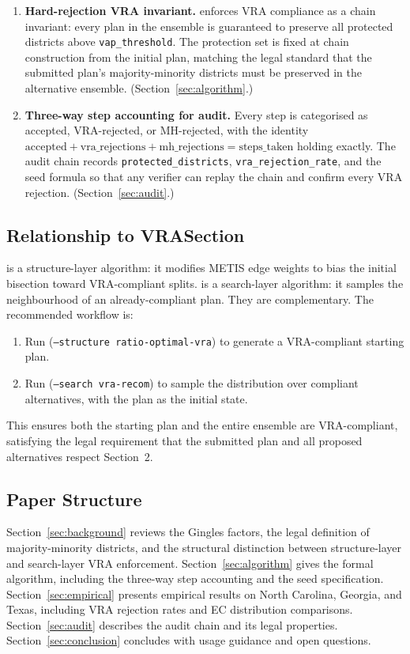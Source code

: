 \begin{enumerate}
  \item \textbf{Hard-rejection VRA invariant.}
        \vr{} enforces VRA compliance as a chain invariant: every plan in
        the ensemble is guaranteed to preserve all protected districts above
        \texttt{vap\_threshold}.
        The protection set is fixed at chain construction from the initial
        plan, matching the legal standard that the submitted plan's
        majority-minority districts must be preserved in the alternative
        ensemble.
        (Section~\ref{sec:algorithm}.)

  \item \textbf{Three-way step accounting for audit.}
        Every step is categorised as accepted, VRA-rejected, or MH-rejected,
        with the identity $\text{accepted} + \text{vra\_rejections} +
        \text{mh\_rejections} = \text{steps\_taken}$ holding exactly.
        The audit chain records \texttt{protected\_districts},
        \texttt{vra\_rejection\_rate}, and the seed formula so that any
        verifier can replay the chain and confirm every VRA rejection.
        (Section~\ref{sec:audit}.)
\end{enumerate}

\subsection{Relationship to VRASection}

\vraSection{} is a structure-layer algorithm: it modifies METIS edge weights
to bias the initial bisection toward VRA-compliant splits.
\vr{} is a search-layer algorithm: it samples the neighbourhood of an
already-compliant plan.
They are complementary.
The recommended workflow is:
\begin{enumerate}
  \item Run \vraSection{} (\texttt{--structure ratio-optimal-vra}) to generate a
        VRA-compliant starting plan.
  \item Run \vr{} (\texttt{--search vra-recom}) to sample the distribution over
        compliant alternatives, with the \vraSection{} plan as the initial state.
\end{enumerate}
This ensures both the starting plan and the entire ensemble are VRA-compliant,
satisfying the legal requirement that the submitted plan and all proposed
alternatives respect Section~2.

\subsection{Paper Structure}

Section~\ref{sec:background} reviews the Gingles factors, the legal definition
of majority-minority districts, and the structural distinction between
structure-layer and search-layer VRA enforcement.
Section~\ref{sec:algorithm} gives the formal \vr{} algorithm, including the
three-way step accounting and the seed specification.
Section~\ref{sec:empirical} presents empirical results on North Carolina,
Georgia, and Texas, including VRA rejection rates and EC distribution
comparisons.
Section~\ref{sec:audit} describes the audit chain and its legal properties.
Section~\ref{sec:conclusion} concludes with usage guidance and open questions.
